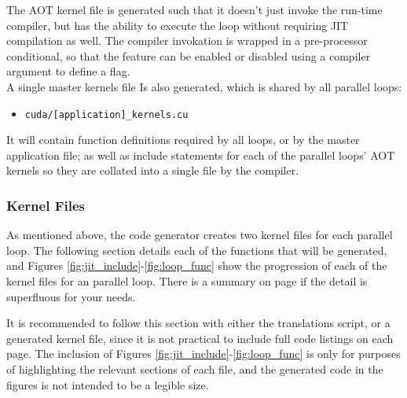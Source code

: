 The AOT kernel file is generated such that it doesn't just invoke the run-time compiler, but has the ability to execute the loop without requiring JIT compilation as well. The compiler invokation is wrapped in a pre-processor conditional, so that the feature can be enabled or disabled using a compiler argument to define a flag.
\\A single master kernels file Is also generated, which is shared by all parallel loops:
\begin{itemize}
\vspace{-1em}
\item{\verb|cuda/[application]_kernels.cu|}
\end{itemize}
It will contain function definitions required by all loops, or by the master application file; as well as include statements for each of the parallel loops' AOT kernels so they are collated into a single file by the compiler.

\subsubsection{Kernel Files}
\label{ss:krnl_files}
As mentioned above, the code generator creates two kernel files for each parallel loop. The following section details each of the functions that will be generated, and Figures \ref{fig:jit_include}-\ref{fig:loop_func} show the progression of each of the kernel files for an parallel loop. There is a summary on page \pageref{impl_summary} if the detail is superfluous for your needs.
\par
It is recommended to follow this section with either the translations script, or a generated kernel file, since it is not practical to include full code listings on each page. The inclusion of Figures \ref{fig:jit_include}-\ref{fig:loop_func} is only for purposes of highlighting the relevant sections of each file, and the generated code in the figures is not intended to be a legible size.

